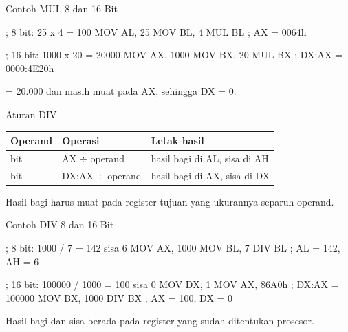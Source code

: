 \documentclass[aspectratio=169,11pt]{beamer}
\begin{document}
\begin{frame}[fragile]{Contoh MUL 8 dan 16 Bit}
\small
\begin{kodeasm}[numbers=none]
; 8 bit: 25 x 4 = 100
MOV AL, 25
MOV BL, 4
MUL BL              ; AX = 0064h

; 16 bit: 1000 x 20 = 20000
MOV AX, 1000
MOV BX, 20
MUL BX              ; DX:AX = 0000:4E20h
\end{kodeasm}

\vspace{0.15em}
{\footnotesize\color{obeGray} = 20.000 dan masih muat
pada AX, sehingga DX = 0.\par}
\end{frame}

\begin{frame}{Aturan DIV}
\footnotesize
\begin{center}
\begin{tabular}{@{}>{\raggedright\arraybackslash}p{2.0cm}
    >{\raggedright\arraybackslash}p{5.0cm}
    >{\raggedright\arraybackslash}p{5.8cm}@{}}
    \toprule
    \textbf{Operand} & \textbf{Operasi} & \textbf{Letak hasil} \\
    \midrule
    8 bit & AX $\div$ operand & hasil bagi di AL, sisa di AH \\
    \addlinespace
    16 bit & DX:AX $\div$ operand & hasil bagi di AX, sisa di DX \\
    \bottomrule
\end{tabular}
\end{center}

\vspace{0.3em}
{\color{obeGray}Hasil bagi harus muat pada register tujuan yang
ukurannya separuh operand.\par}
\end{frame}

\begin{frame}[fragile]{Contoh DIV 8 dan 16 Bit}
\small
\begin{kodeasm}[numbers=none]
; 8 bit: 1000 / 7 = 142 sisa 6
MOV AX, 1000
MOV BL, 7
DIV BL              ; AL = 142, AH = 6

; 16 bit: 100000 / 1000 = 100 sisa 0
MOV DX, 1
MOV AX, 86A0h       ; DX:AX = 100000
MOV BX, 1000
DIV BX              ; AX = 100, DX = 0
\end{kodeasm}

\vspace{0.1em}
{\footnotesize\color{obeGray}Hasil bagi dan sisa berada pada
register yang sudah ditentukan prosesor.\par}
\end{frame}
\end{document}
